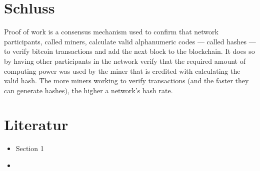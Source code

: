 \documentclass[ngerman]{scrreprt}
\begin{document}
\chapter{Schluss}
Proof of work is a consensus mechanism used to confirm that network participants, called miners, calculate valid alphanumeric codes — called hashes — to verify bitcoin transactions and add the next block to the blockchain. It does so by having other participants in the network verify that the required amount of computing power was used by the miner that is credited with calculating the valid hash. The more miners working to verify transactions (and the faster they can generate hashes), the higher a network's hash rate.


\chapter{Literatur}
\begin{itemize}
	\item Section 1

	\item 
	
\end{itemize}
\end{document}
